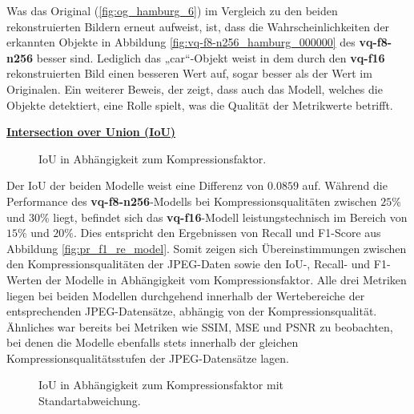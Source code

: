             Was das Original (\ref{fig:og_hamburg_6}) im Vergleich zu den beiden rekonstruierten Bildern erneut aufweist, ist, dass die Wahrscheinlichkeiten der erkannten Objekte in Abbildung \ref{fig:vq-f8-n256_hamburg_000000} des \textbf{vq-f8-n256} besser sind. Lediglich das „car“-Objekt weist in dem durch den \textbf{vq-f16} rekonstruierten Bild einen besseren Wert auf, sogar besser als der Wert im Originalen.
            Ein weiterer Beweis, der zeigt, dass auch das Modell, welches die Objekte detektiert, eine Rolle spielt, was die Qualität der Metrikwerte betrifft.
            
\newpage  
            \underline{\textbf{Intersection over Union (IoU)}}

            \begin{figure}[!htb]
                \centering
                
                \caption{IoU in Abhängigkeit zum Kompressionsfaktor.}
                \label{fig:iou_model}
            \end{figure}

            Der IoU der beiden Modelle weist eine Differenz von $0.0859$ auf. Während die Performance des \textbf{vq-f8-n256}-Modells bei Kompressionsqualitäten zwischen $25\%$ und $30\%$ liegt, befindet sich das \textbf{vq-f16}-Modell leistungstechnisch im Bereich von $15\%$ und $20\%$. Dies entspricht den Ergebnissen von Recall und F1-Score aus Abbildung \ref{fig:pr_f1_re_model}.
            Somit zeigen sich Übereinstimmungen zwischen den Kompressionsqualitäten der JPEG-Daten sowie den IoU-, Recall- und F1-Werten der Modelle in Abhängigkeit vom Kompressionsfaktor. 
            Alle drei Metriken liegen bei beiden Modellen durchgehend innerhalb der Wertebereiche der entsprechenden JPEG-Datensätze, abhängig von der Kompressionsqualität. Ähnliches war bereits bei Metriken wie SSIM, MSE und PSNR zu beobachten, bei denen die Modelle ebenfalls stets innerhalb der gleichen Kompressionsqualitätsstufen der JPEG-Datensätze lagen.
            

\newpage 
            \begin{figure}[!htb]
                \centering
                
                \caption{IoU in Abhängigkeit zum Kompressionsfaktor mit Standartabweichung.}
                \label{fig:iou_std_model}
            \end{figure}  
            
